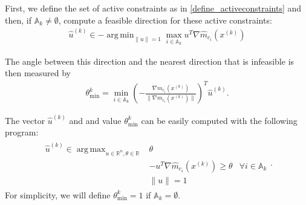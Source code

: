 \documentclass{article}
\theoremstyle{case}
\DeclareMathOperator*{\argmin}{arg\,min}
\DeclareMathOperator*{\argmax}{arg\,max}
\newcommand{\activeconstraintsk}{{\mathbb A_{k}}}
\newcommand{\hgik}{{\frac{\nabla m_{c_i}(\xk)}{\|\nabla m_{c_i}(\xk)\|}}}
\newcommand{\hgmcik}{{\nabla \hat m_{c_i}(\xk)}}
\newcommand{\huk}{{{\hat u}^{(k)}}}
\newcommand{\reals}{\mathbb R}
\newcommand{\Rn}{\mathbb R^n}
\newcommand{\thetamink}{{\theta^k_{\text{min}}}}
\newcommand{\xk}{{x^{(k)}}}
\begin{document}
First, we define the set of active constraints as in \cref{define_activeconstraints}
and then, if $\activeconstraintsk \ne \emptyset$, compute a feasible direction for these active constraints:
\begin{align}
\huk \in -\argmin_{\|u\| = 1} \max_{i \in \activeconstraintsk} u^T\hgmcik\label{define_u}
\end{align}


The angle between this direction and the nearest direction that is infeasible is then measured by
\begin{align}
\thetamink = \min_{i \in \activeconstraintsk} \left(-\hgik\right)^T \huk \label{define_thetamink}.
\end{align}

The vector $\huk$ and and value $\thetamink$ can be easily computed with the following program:
\begin{align*}
\begin{array}{ccc}
\huk \in \argmax_{u\in\Rn, \theta\in\reals} & \theta \\
& -u^T \hgmcik \ge \theta & \forall i \in \activeconstraintsk \\
& \|u \| = 1& 
\end{array}.
\end{align*}
For simplicity, we will define $\thetamink = 1$ if $\activeconstraintsk = \emptyset$.
\end{document}
